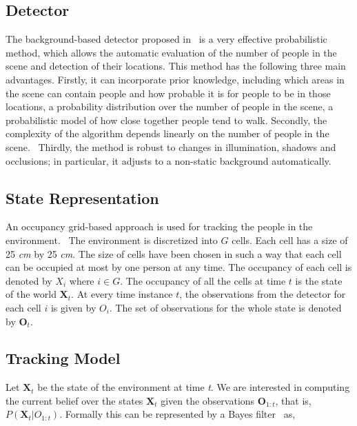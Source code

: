 \subsection{Detector}
The background-based detector proposed in~\cite{englebienne-bnaic} is a very effective probabilistic method, which allows the automatic evaluation of the number of people in the scene and detection of their locations. This method has the following three main advantages. Firstly, it can incorporate prior knowledge, including which areas in the scene can contain people and how probable it is for people to be in those locations, a probability distribution over the number of people in the scene, a probabilistic model of how close
together people tend to walk. Secondly, the complexity of the algorithm depends linearly on the number of people in the scene.%
~Thirdly, the method is robust to changes in illumination, shadows and occlusions; in particular, it adjusts to a non-static background automatically.

\subsection{State Representation}

An occupancy grid-based approach is used for tracking the people in the environment.%
~The environment is discretized into $G$ cells. Each cell has a size of 25 \textit{cm} by 25 \textit{cm}. The size of cells have been chosen in such a way that each cell can be occupied at most by one person at any time. The occupancy of each cell is denoted by $X_{i}$ where $i \in G$. The occupancy of all the cells at time $t$ is the state of the world $\textbf{X}_{t}$. At every time instance $t$, the observations from the detector for each cell $i$ is given by $O_{i}$. The set of observations for the whole state is denoted by $\textbf{O}_{t}$. 

\subsection{Tracking Model}

Let $\textbf{X}_{t}$ be the state of the environment at time \textit{t}. We are interested in computing the current belief over the states $\textbf{X}_{t}$ given the observations $\textbf{O}_{1:t}$, that is, $P(\textbf{X}_{t}|O_{1:t})$. Formally this can be represented by a Bayes filter~\cite{khan2004mcmc} as,

